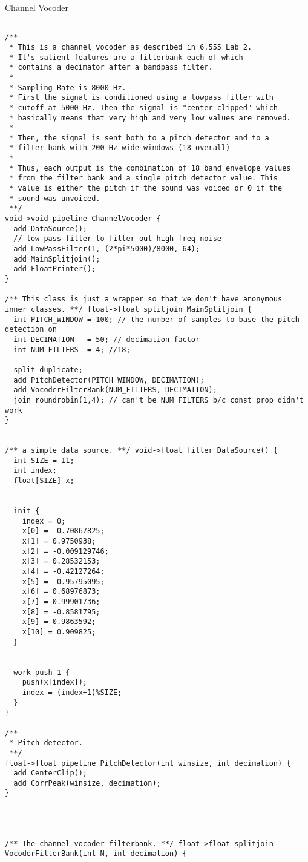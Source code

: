Channel Vocoder
\begin{scriptsize}
\begin{verbatim}

/**
 * This is a channel vocoder as described in 6.555 Lab 2.
 * It's salient features are a filterbank each of which
 * contains a decimator after a bandpass filter.
 *
 * Sampling Rate is 8000 Hz.
 * First the signal is conditioned using a lowpass filter with
 * cutoff at 5000 Hz. Then the signal is "center clipped" which
 * basically means that very high and very low values are removed.
 *
 * Then, the signal is sent both to a pitch detector and to a
 * filter bank with 200 Hz wide windows (18 overall)
 *
 * Thus, each output is the combination of 18 band envelope values
 * from the filter bank and a single pitch detector value. This
 * value is either the pitch if the sound was voiced or 0 if the
 * sound was unvoiced.
 **/
void->void pipeline ChannelVocoder {
  add DataSource();
  // low pass filter to filter out high freq noise
  add LowPassFilter(1, (2*pi*5000)/8000, 64);
  add MainSplitjoin();
  add FloatPrinter();
}

/** This class is just a wrapper so that we don't have anonymous
inner classes. **/ float->float splitjoin MainSplitjoin {
  int PITCH_WINDOW = 100; // the number of samples to base the pitch detection on
  int DECIMATION   = 50; // decimation factor
  int NUM_FILTERS  = 4; //18;

  split duplicate;
  add PitchDetector(PITCH_WINDOW, DECIMATION);
  add VocoderFilterBank(NUM_FILTERS, DECIMATION);
  join roundrobin(1,4); // can't be NUM_FILTERS b/c const prop didn't work
}


/** a simple data source. **/ void->float filter DataSource() {
  int SIZE = 11;
  int index;
  float[SIZE] x;


  init {
    index = 0;
    x[0] = -0.70867825;
    x[1] = 0.9750938;
    x[2] = -0.009129746;
    x[3] = 0.28532153;
    x[4] = -0.42127264;
    x[5] = -0.95795095;
    x[6] = 0.68976873;
    x[7] = 0.99901736;
    x[8] = -0.8581795;
    x[9] = 0.9863592;
    x[10] = 0.909825;
  }


  work push 1 {
    push(x[index]);
    index = (index+1)%SIZE;
  }
}

/**
 * Pitch detector.
 **/
float->float pipeline PitchDetector(int winsize, int decimation) {
  add CenterClip();
  add CorrPeak(winsize, decimation);
}




/** The channel vocoder filterbank. **/ float->float splitjoin
VocoderFilterBank(int N, int decimation) {


\end{verbatim}
\end{scriptsize}

